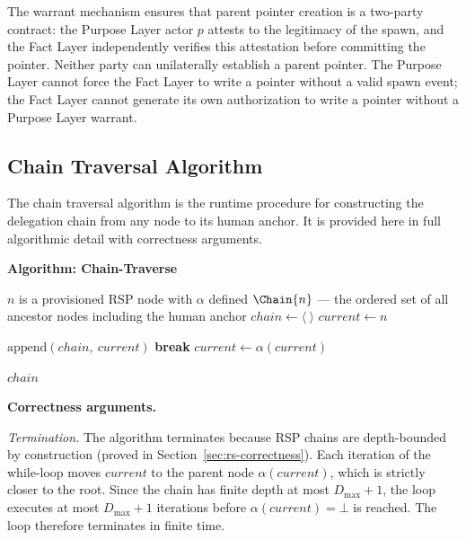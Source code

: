The warrant mechanism ensures that parent pointer creation is a two-party contract: the Purpose Layer actor $p$ attests to the legitimacy of the spawn, and the Fact Layer independently verifies this attestation before committing the pointer. Neither party can unilaterally establish a parent pointer. The Purpose Layer cannot force the Fact Layer to write a pointer without a valid spawn event; the Fact Layer cannot generate its own authorization to write a pointer without a Purpose Layer warrant.

\subsection{Chain Traversal Algorithm}
\label{sec:chain-traversal-algorithm}

The chain traversal algorithm is the runtime procedure for constructing the delegation chain from any node to its human anchor. It is provided here in full algorithmic detail with correctness arguments.

\medskip
\noindent\textbf{Algorithm: Chain-Traverse}

\begin{algorithm}
\caption{Chain-Traverse($n$) --- Build the delegation chain from node $n$ to the human anchor}
\label{alg:chain-traverse}
\begin{algorithmic}[1]
\REQUIRE $n$ is a provisioned RSP node with $\alpha$ defined
\ENSURE $\Chain{n}$ --- the ordered set of all ancestor nodes including the human anchor
\STATE $chain \leftarrow \langle\ \rangle$ 
\STATE $current \leftarrow n$ 

    \STATE $\text{append}(chain,\ current)$ 
        \STATE \textbf{break} 
    \ENDIF
    \STATE $current \leftarrow \alpha(current)$ 
\ENDWHILE

\RETURN $chain$
\end{algorithmic}
\end{algorithm}

\medskip
\noindent\textbf{Correctness arguments.}

\textit{Termination.} The algorithm terminates because RSP chains are depth-bounded by construction (proved in Section~\ref{sec:rs-correctness}). Each iteration of the while-loop moves $current$ to the parent node $\alpha(current)$, which is strictly closer to the root. Since the chain has finite depth at most $D_{\max} + 1$, the loop executes at most $D_{\max} + 1$ iterations before $\alpha(current) = \bot$ is reached. The loop therefore terminates in finite time.

